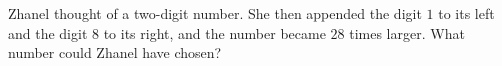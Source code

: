 Zhanel thought of a two-digit number. She then appended the digit $1$ to its left and the digit $8$ to its right, and the number became $28$ times larger. What number could Zhanel have chosen?
